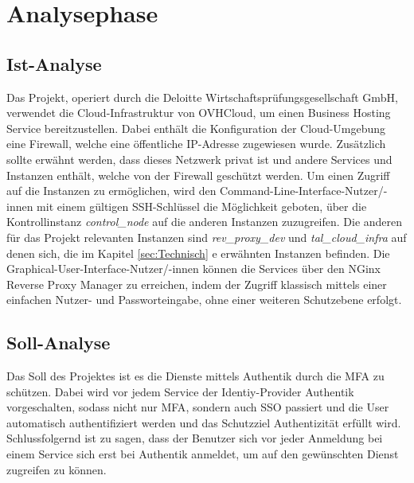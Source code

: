 \section{Analysephase} 
\label{sec:Analysephase}


\subsection{Ist-Analyse} 
\label{sec:IstAnalyse}
Das Projekt, operiert durch die Deloitte Wirtschaftsprüfungsgesellschaft GmbH, verwendet die Cloud-Infrastruktur 
von OVHCloud, um einen Business Hosting Service bereitzustellen. Dabei enthält die Konfiguration der 
Cloud-Umgebung eine Firewall, welche eine öffentliche IP-Adresse zugewiesen wurde. Zusätzlich sollte erwähnt werden, 
dass dieses Netzwerk privat ist und andere Services und Instanzen enthält, welche von der Firewall geschützt werden.
Um einen Zugriff auf die Instanzen zu ermöglichen, wird den Command-Line-Interface-Nutzer/-innen mit einem gültigen
SSH-Schlüssel die Möglichkeit geboten, über die Kontrollinstanz \textit{control\_node} auf die anderen Instanzen 
zuzugreifen. Die anderen für das Projekt relevanten Instanzen sind \textit{rev\_proxy\_dev} und \textit{tal\_cloud\_infra} 
auf denen sich, die im Kapitel \ref*{sec:Technisch} e  
erwähnten Instanzen befinden. Die Graphical-User-Interface-Nutzer/-innen können die Services über den NGinx Reverse Proxy Manager 
zu erreichen, indem der Zugriff klassisch mittels einer einfachen Nutzer- und Passworteingabe, ohne einer weiteren 
Schutzebene erfolgt.

\subsection{Soll-Analyse}
\label{sec:SollAnalyse}
Das Soll des Projektes ist es die Dienste mittels Authentik durch die \acs*{MFA} zu schützen. Dabei wird vor jedem Service 
der Identiy-Provider Authentik vorgeschalten, sodass nicht nur \acs*{MFA}, sondern auch SSO passiert und die User automatisch 
authentifiziert werden und das Schutzziel Authentizität erfüllt wird.
\\Schlussfolgernd ist zu sagen, dass der Benutzer sich vor jeder Anmeldung bei einem Service sich erst bei Authentik 
anmeldet, um auf den gewünschten Dienst zugreifen zu können.



